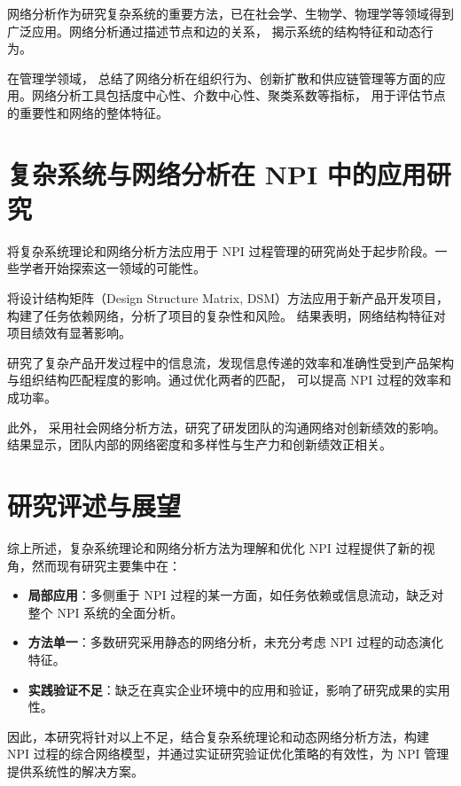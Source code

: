 网络分析作为研究复杂系统的重要方法，已在社会学、生物学、物理学等领域得到广泛应用\citep{newman2010networks}。网络分析通过描述节点和边的关系，
揭示系统的结构特征和动态行为\citep{barabasiNetworkScience2013}。

在管理学领域，\citet{borgatti2009network} 总结了网络分析在组织行为、创新扩散和供应链管理等方面的应用。网络分析工具包括度中心性、介数中心性、聚类系数等指标，
用于评估节点的重要性和网络的整体特征\citep{freeman1978centrality}。

\section{复杂系统与网络分析在 NPI 中的应用研究}

将复杂系统理论和网络分析方法应用于 NPI 过程管理的研究尚处于起步阶段。一些学者开始探索这一领域的可能性。

\citet{browning2001applying} 将设计结构矩阵（Design Structure Matrix, DSM）方法应用于新产品开发项目，构建了任务依赖网络，分析了项目的复杂性和风险。
结果表明，网络结构特征对项目绩效有显著影响。

\citet{sosa2004misalignment} 研究了复杂产品开发过程中的信息流，发现信息传递的效率和准确性受到产品架构与组织结构匹配程度的影响。通过优化两者的匹配，
可以提高 NPI 过程的效率和成功率。

此外，\citet{reagans2001networks} 采用社会网络分析方法，研究了研发团队的沟通网络对创新绩效的影响。结果显示，团队内部的网络密度和多样性与生产力和创新绩效正相关。

\section{研究评述与展望}

综上所述，复杂系统理论和网络分析方法为理解和优化 NPI 过程提供了新的视角，然而现有研究主要集中在：

\begin{itemize}
  \item \textbf{局部应用}：多侧重于 NPI 过程的某一方面，如任务依赖或信息流动，缺乏对整个 NPI 系统的全面分析。
  \item \textbf{方法单一}：多数研究采用静态的网络分析，未充分考虑 NPI 过程的动态演化特征。
  \item \textbf{实践验证不足}：缺乏在真实企业环境中的应用和验证，影响了研究成果的实用性。
\end{itemize}

因此，本研究将针对以上不足，结合复杂系统理论和动态网络分析方法，构建 NPI 过程的综合网络模型，并通过实证研究验证优化策略的有效性，为 NPI 管理提供系统性的解决方案。

